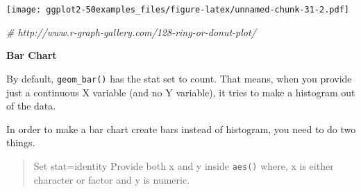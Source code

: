 \documentclass[a4paper]{article}
\newenvironment{Shaded}{\begin{snugshade}}{\end{snugshade}}
\newcommand{\KeywordTok}[1]{\textcolor[rgb]{0.13,0.29,0.53}{\textbf{#1}}}
\newcommand{\DataTypeTok}[1]{\textcolor[rgb]{0.13,0.29,0.53}{#1}}
\newcommand{\DecValTok}[1]{\textcolor[rgb]{0.00,0.00,0.81}{#1}}
\newcommand{\FloatTok}[1]{\textcolor[rgb]{0.00,0.00,0.81}{#1}}
\newcommand{\StringTok}[1]{\textcolor[rgb]{0.31,0.60,0.02}{#1}}
\newcommand{\CommentTok}[1]{\textcolor[rgb]{0.56,0.35,0.01}{\textit{#1}}}
\newcommand{\OtherTok}[1]{\textcolor[rgb]{0.56,0.35,0.01}{#1}}
\newcommand{\OperatorTok}[1]{\textcolor[rgb]{0.81,0.36,0.00}{\textbf{#1}}}
\newcommand{\NormalTok}[1]{#1}
\begin{document}
\begin{Shaded}
\end{Shaded}

\texttt{[image: ggplot2-50examples\_files/figure-latex/unnamed-chunk-31-2.pdf]}

\begin{Shaded}
\begin{Highlighting}[]
\CommentTok{# http://www.r-graph-gallery.com/128-ring-or-donut-plot/}
\end{Highlighting}
\end{Shaded}

\newpage

\textbf{Bar Chart}

By default, \texttt{geom\_bar()} has the stat set to count. That means,
when you provide just a continuous X variable (and no Y variable), it
tries to make a histogram out of the data.

In order to make a bar chart create bars instead of histogram, you need
to do two things.

\begin{quote}
Set stat=identity Provide both x and y inside \texttt{aes()} where, x is
either character or factor and y is numeric.
\end{quote}
\end{document}

